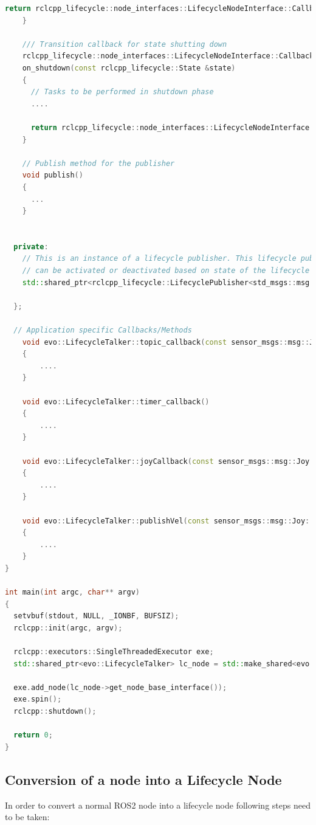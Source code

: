 \begin{lstlisting}[language=cpp]
      return rclcpp_lifecycle::node_interfaces::LifecycleNodeInterface::CallbackReturn::SUCCESS;
    }

    /// Transition callback for state shutting down
    rclcpp_lifecycle::node_interfaces::LifecycleNodeInterface::CallbackReturn
    on_shutdown(const rclcpp_lifecycle::State &state)
    {
      // Tasks to be performed in shutdown phase
      ....

      return rclcpp_lifecycle::node_interfaces::LifecycleNodeInterface::CallbackReturn::SUCCESS;
    }

	// Publish method for the publisher
	void publish()
    { 
      ...
    }

    
  private:
    // This is an instance of a lifecycle publisher. This lifecycle publisher
    // can be activated or deactivated based on state of the lifecycle node
    std::shared_ptr<rclcpp_lifecycle::LifecyclePublisher<std_msgs::msg::String>> pub_;

  };

  // Application specific Callbacks/Methods
    void evo::LifecycleTalker::topic_callback(const sensor_msgs::msg::Joy::SharedPtr msg) const
    {
      	....
    }

    void evo::LifecycleTalker::timer_callback()
    {
		....
    }

    void evo::LifecycleTalker::joyCallback(const sensor_msgs::msg::Joy::SharedPtr msg)
    {
		....
    }

    void evo::LifecycleTalker::publishVel(const sensor_msgs::msg::Joy::SharedPtr msg)
    {
		....
    }
}

int main(int argc, char** argv)
{
  setvbuf(stdout, NULL, _IONBF, BUFSIZ);
  rclcpp::init(argc, argv);

  rclcpp::executors::SingleThreadedExecutor exe;
  std::shared_ptr<evo::LifecycleTalker> lc_node = std::make_shared<evo::LifecycleTalker>("lifecycle_joytovel");

  exe.add_node(lc_node->get_node_base_interface());
  exe.spin();
  rclcpp::shutdown();

  return 0;
}
\end{lstlisting}


\subsection{Conversion of a node into a Lifecycle Node}
In order to convert a normal ROS2 node into a lifecycle node following steps need to be taken:


